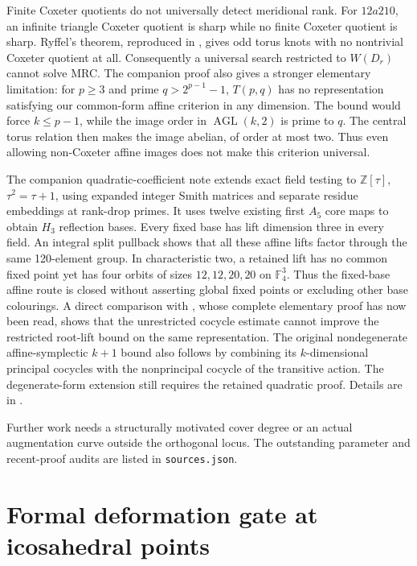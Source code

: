 \documentclass[11pt]{article}
\begin{document}
Finite Coxeter quotients do not universally detect meridional rank.
For $12a210$, an infinite triangle Coxeter quotient is sharp while no
finite Coxeter quotient is sharp. Ryffel's theorem, reproduced in
\cite{bkm}, gives odd torus knots with no nontrivial Coxeter quotient at
all. Consequently a universal search restricted to $W(D_r)$ cannot solve
MRC. The companion proof also gives a stronger elementary limitation:
for $p\ge3$ and prime $q>2^{p-1}-1$, $T(p,q)$ has no representation
satisfying our common-form affine criterion in any dimension. The bound
would force $k\le p-1$, while the image order in $\operatorname{AGL}(k,2)$
is prime to $q$. The central torus relation then makes the image abelian,
of order at most two. Thus even allowing non-Coxeter affine images
does not make this criterion universal.

The companion quadratic-coefficient note extends exact field testing
to $\mathbb Z[\tau]$, $\tau^2=\tau+1$, using expanded integer Smith
matrices and separate residue embeddings at rank-drop primes. It
uses twelve existing first $A_5$ core maps to obtain $H_3$ reflection
bases. Every fixed base has lift dimension three in every field.
An integral split pullback shows that all these affine lifts factor
through the same 120-element group. In characteristic two, a retained
lift has no common fixed point yet has four orbits of sizes
$12,12,20,20$ on $\mathbb F_4^3$. Thus the fixed-base affine route is
closed without asserting global fixed points or excluding other
base colourings. A direct comparison with \cite[Lemma 6.2]{whitehead},
whose complete elementary proof has now been read, shows that the
unrestricted cocycle estimate cannot improve the restricted root-lift
bound on the same representation.
The original nondegenerate affine-symplectic $k+1$ bound also follows
by combining its $k$-dimensional principal cocycles with the
nonprincipal cocycle of the transitive action. The degenerate-form
extension still requires the retained quadratic proof. Details are in
.

Further work needs a structurally motivated cover degree or an actual
augmentation curve outside the orthogonal locus. The outstanding
parameter and recent-proof audits are listed in \texttt{sources.json}.

\section{Formal deformation gate at icosahedral points}
\end{document}
